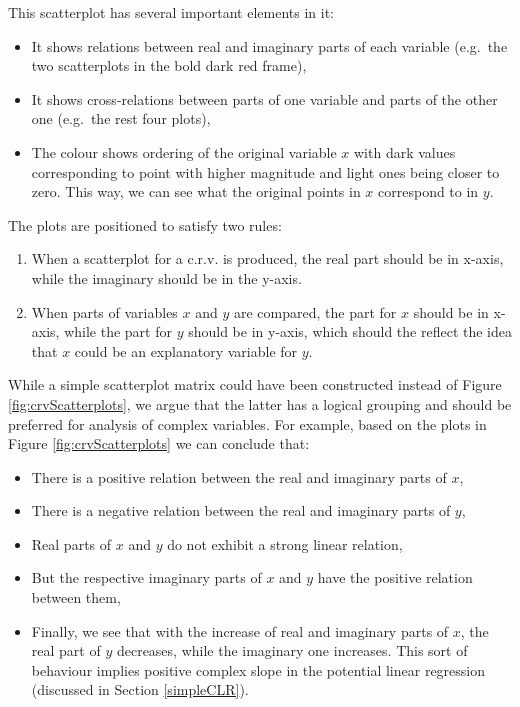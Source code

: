 \documentclass[
]{book}
\providecommand{\tightlist}{%
  \setlength{\itemsep}{0pt}\setlength{\parskip}{0pt}}
\begin{document}
This scatterplot has several important elements in it:

\begin{itemize}
\tightlist
\item
  It shows relations between real and imaginary parts of each variable (e.g.~the two scatterplots in the bold dark red frame),
\item
  It shows cross-relations between parts of one variable and parts of the other one (e.g.~the rest four plots),
\item
  The colour shows ordering of the original variable \(x\) with dark values corresponding to point with higher magnitude and light ones being closer to zero. This way, we can see what the original points in \(x\) correspond to in \(y\).
\end{itemize}

The plots are positioned to satisfy two rules:

\begin{enumerate}
\def\labelenumi{\arabic{enumi}.}
\tightlist
\item
  When a scatterplot for a c.r.v. is produced, the real part should be in x-axis, while the imaginary should be in the y-axis.
\item
  When parts of variables \(x\) and \(y\) are compared, the part for \(x\) should be in x-axis, while the part for \(y\) should be in y-axis, which should the reflect the idea that \(x\) could be an explanatory variable for \(y\).
\end{enumerate}

While a simple scatterplot matrix could have been constructed instead of Figure \ref{fig:crvScatterplots}, we argue that the latter has a logical grouping and should be preferred for analysis of complex variables. For example, based on the plots in Figure \ref{fig:crvScatterplots} we can conclude that:

\begin{itemize}
\tightlist
\item
  There is a positive relation between the real and imaginary parts of \(x\),
\item
  There is a negative relation between the real and imaginary parts of \(y\),
\item
  Real parts of \(x\) and \(y\) do not exhibit a strong linear relation,
\item
  But the respective imaginary parts of \(x\) and \(y\) have the positive relation between them,
\item
  Finally, we see that with the increase of real and imaginary parts of \(x\), the real part of \(y\) decreases, while the imaginary one increases. This sort of behaviour implies positive complex slope in the potential linear regression (discussed in Section \ref{simpleCLR}).
\end{itemize}
\end{document}
